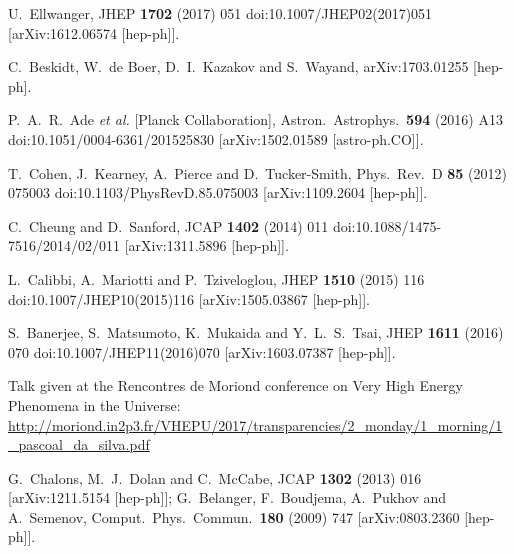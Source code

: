 \documentclass[12pt,twoside]{article}
\begin{document}
\begin{thebibliography}{99}
  U.~Ellwanger,
  JHEP {\bf 1702} (2017) 051
  doi:10.1007/JHEP02(2017)051
  [arXiv:1612.06574 [hep-ph]].
  
  C.~Beskidt, W.~de Boer, D.~I.~Kazakov and S.~Wayand,
  arXiv:1703.01255 [hep-ph].
 


  P.~A.~R.~Ade {\it et al.} [Planck Collaboration],
  Astron.\ Astrophys.\  {\bf 594} (2016) A13
  doi:10.1051/0004-6361/201525830
  [arXiv:1502.01589 [astro-ph.CO]].
  
  
  
  T.~Cohen, J.~Kearney, A.~Pierce and D.~Tucker-Smith,
  Phys.\ Rev.\ D {\bf 85} (2012) 075003
  doi:10.1103/PhysRevD.85.075003
  [arXiv:1109.2604 [hep-ph]].
 
  C.~Cheung and D.~Sanford,
  JCAP {\bf 1402} (2014) 011
  doi:10.1088/1475-7516/2014/02/011
  [arXiv:1311.5896 [hep-ph]].
 
  L.~Calibbi, A.~Mariotti and P.~Tziveloglou,
  JHEP {\bf 1510} (2015) 116
  doi:10.1007/JHEP10(2015)116
  [arXiv:1505.03867 [hep-ph]].
  
  S.~Banerjee, S.~Matsumoto, K.~Mukaida and Y.~L.~S.~Tsai,
  JHEP {\bf 1611} (2016) 070
  doi:10.1007/JHEP11(2016)070
  [arXiv:1603.07387 [hep-ph]].
 
 
Talk given at the Rencontres de Moriond conference on Very
High Energy Phenomena in the Universe: \url{http://moriond.in2p3.fr/VHEPU/2017/transparencies/2_monday/1_morning/1_pascoal_da_silva.pdf}   
 
  G.~Chalons, M.~J.~Dolan and C.~McCabe,
  JCAP {\bf 1302} (2013) 016
  [arXiv:1211.5154 [hep-ph]];
  G.~Belanger, F.~Boudjema, A.~Pukhov and A.~Semenov,
  Comput.\ Phys.\ Commun.\  {\bf 180} (2009) 747
  [arXiv:0803.2360 [hep-ph]].


\end{thebibliography}
\end{document}
